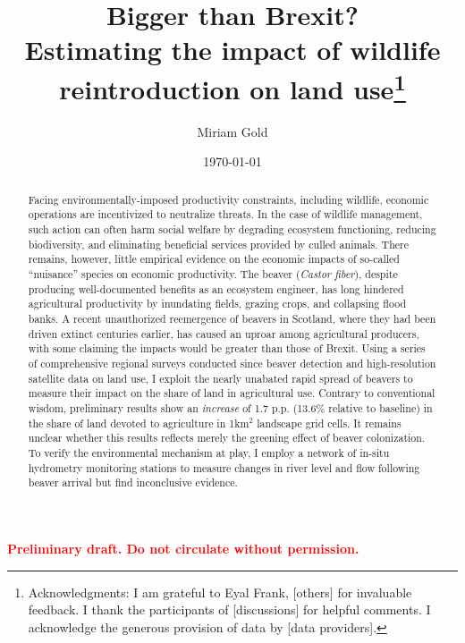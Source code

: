 \documentclass[11pt, english, letterpaper]{article}
\begin{document}
\justifying


\vspace{-2em} 

\title{Bigger than Brexit? \\ Estimating the impact of wildlife reintroduction on land use\thanks{Acknowledgments: I am grateful to Eyal Frank, [others] for invaluable feedback. I thank the participants of [discussions] for helpful comments. I acknowledge the generous provision of data by [data providers].}}

\author[1]{\small Miriam Gold}

\date{\today}
\maketitle

\begin{center}
\vspace{-3em}
\textbf{\textcolor{red}{Preliminary draft. Do not circulate without permission.}}
\end{center}

\begin{abstract}
    \singlespacing 
    Facing environmentally-imposed productivity constraints, including wildlife, economic operations are incentivized to neutralize threats. In the case of wildlife management, such action can often harm social welfare by degrading ecosystem functioning, reducing biodiversity, and eliminating beneficial services provided by culled animals. There remains, however, little empirical evidence on the economic impacts of so-called ``nuisance'' species on economic productivity. The beaver (\textit{Castor fiber}), despite producing well-documented benefits as an ecosystem engineer, has long hindered agricultural productivity by inundating fields, grazing crops, and collapsing flood banks. A recent unauthorized reemergence of beavers in Scotland, where they had been driven extinct centuries earlier, has caused an uproar among agricultural producers, with some claiming the impacts would be greater than those of Brexit. Using a series of comprehensive regional surveys conducted since beaver detection and high-resolution satellite data on land use, I exploit the nearly unabated rapid spread of beavers to measure their impact on the share of land in agricultural use. Contrary to conventional wisdom, preliminary results show an \textit{increase} of 1.7 p.p. (13.6\% relative to baseline) in the share of land devoted to agriculture in 1km$^2$ landscape grid cells. It remains unclear whether this results reflects merely the greening effect of beaver colonization. To verify the environmental mechanism at play, I employ a network of in-situ hydrometry monitoring stations to measure changes in river level and flow following beaver arrival but find inconclusive evidence.
\end{abstract}
\end{document}
